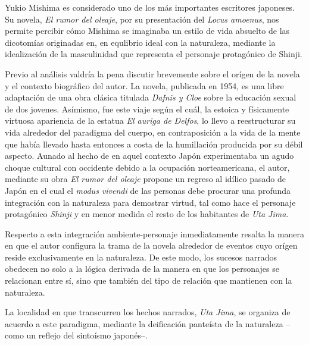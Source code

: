 Yukio Mishima es considerado uno de los más importantes escritores japoneses. 
Su novela, \emph{El rumor del oleaje}, por su presentación del \emph{Locus amoenus}, nos permite percibir cómo Mishima se imaginaba un estilo de vida absuelto de las dicotomías originadas en, en equlibrio ideal con la naturaleza, mediante la idealización de la masculinidad que representa el personaje protagónico de Shinji.%

Previo al análisis valdría la pena discutir brevemente sobre el orígen de la novela y el contexto biográfico del autor. 
La novela, publicada en 1954, es una libre adaptación de una obra clásica titulada \emph{Dafnis y Cloe} sobre la educación sexual de dos jovenes. %
Asímismo, fue este viaje según el cuál, la estoica y físicamente virtuosa apariencia de la estatua \emph{El auriga de Delfos}, lo llevo a reestructurar su vida alrededor del paradigma del cuerpo, en contraposición a la vida de la mente que había llevado hasta entonces a costa de la humillación producida por su débil aspecto. Aunado al hecho de en aquel contexto Japón experimentaba un agudo choque cultural con occidente debido a la ocupación norteamericana, el autor, mediante su obra \emph{El rumor del oleaje} propone un regreso al idílico pasado de Japón en el cual el \emph{modus vivendi} de las personas debe procurar una profunda integración con la naturaleza para demostrar virtud, tal como hace el personaje protagónico \emph{Shinji} y en menor medida el resto de los habitantes de \emph{Uta Jima}. %
 
 Respecto a esta integración ambiente-personaje inmediatamente resalta la manera en que el autor configura la trama de la novela alrededor de eventos cuyo orígen reside exclusivamente en la naturaleza. De este modo, los sucesos narrados obedecen no solo a la lógica derivada de la manera en que los personajes se relacionan entre sí, sino que también del tipo de relación que mantienen con la naturaleza.

  La localidad en que transcurren los hechos narrados, \emph{Uta Jima}, se organiza  de acuerdo a este paradigma, mediante la deificación panteísta de la naturaleza --como un reflejo del sintoísmo japonés--. %
